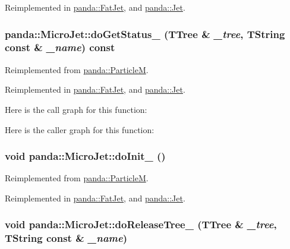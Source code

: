 Reimplemented in \hyperlink{classpanda_1_1FatJet_a32dbcd6e7cf31c79aed92220c43daed7}{panda::FatJet}, and \hyperlink{classpanda_1_1Jet_a9f7d21237e7933ee156f5edea6a27696}{panda::Jet}.\hypertarget{classpanda_1_1MicroJet_a2055608524fe0bb8e4fae8ef78e3333e}{
\subsubsection[{doGetStatus\_\-}]{ panda::MicroJet::doGetStatus\_\- (TTree \& {\em \_\-tree}, \/  TString const \& {\em \_\-name}) const}}
\label{classpanda_1_1MicroJet_a2055608524fe0bb8e4fae8ef78e3333e}


Reimplemented from \hyperlink{classpanda_1_1ParticleM_a003a63672058369e9bbea413e055b1c1}{panda::ParticleM}.

Reimplemented in \hyperlink{classpanda_1_1FatJet_a96835f1d5e56985c033cc73029dccef0}{panda::FatJet}, and \hyperlink{classpanda_1_1Jet_a4ecbac39b42fe464f6346711aed38aba}{panda::Jet}.

Here is the call graph for this function:

Here is the caller graph for this function:\hypertarget{classpanda_1_1MicroJet_a15d337ea6042caf8a37d2f4172b9ab01}{
\subsubsection[{doInit\_\-}]{\setlength{\rightskip}{0pt plus 5cm}void panda::MicroJet::doInit\_\- ()}}
\label{classpanda_1_1MicroJet_a15d337ea6042caf8a37d2f4172b9ab01}


Reimplemented from \hyperlink{classpanda_1_1ParticleM_ae912914e3970c1fb238589f0ccc783f4}{panda::ParticleM}.

Reimplemented in \hyperlink{classpanda_1_1FatJet_aae0c0b4e50cf6aae1d6c12b31d8585d9}{panda::FatJet}, and \hyperlink{classpanda_1_1Jet_ac8801b9ee9b645f4d0a24aa34accb414}{panda::Jet}.\hypertarget{classpanda_1_1MicroJet_a76d94a27064103f68ac0532d7d610889}{
\subsubsection[{doReleaseTree\_\-}]{\setlength{\rightskip}{0pt plus 5cm}void panda::MicroJet::doReleaseTree\_\- (TTree \& {\em \_\-tree}, \/  TString const \& {\em \_\-name})}}
\label{classpanda_1_1MicroJet_a76d94a27064103f68ac0532d7d610889}


